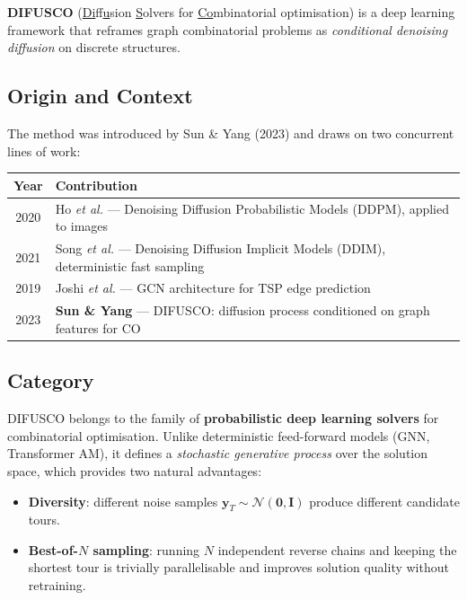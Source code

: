 \documentclass[12pt,a4paper]{article}
\begin{document}
\textbf{DIFUSCO} (\underline{Di}f\underline{fu}sion \underline{S}olvers for
\underline{Co}mbinatorial optimisation) is a deep learning framework that
reframes graph combinatorial problems as \emph{conditional denoising diffusion}
on discrete structures.

\subsection*{Origin and Context}

The method was introduced by Sun \& Yang (2023) and draws on two concurrent
lines of work:

\begin{center}
\begin{tabularx}{\linewidth}{c>{\raggedright\arraybackslash}X}
\toprule
\textbf{Year} & \textbf{Contribution} \\
\midrule
2020 & Ho \textit{et al.} --- Denoising Diffusion Probabilistic Models (DDPM),
       applied to images \\
2021 & Song \textit{et al.} --- Denoising Diffusion Implicit Models (DDIM),
       deterministic fast sampling \\
2019 & Joshi \textit{et al.} --- GCN architecture for TSP edge prediction \\
2023 & \textbf{Sun \& Yang} --- DIFUSCO: diffusion process conditioned on graph
       features for CO \\
\bottomrule
\end{tabularx}
\end{center}

\subsection*{Category}

DIFUSCO belongs to the family of \textbf{probabilistic deep learning solvers}
for combinatorial optimisation.
Unlike deterministic feed-forward models (GNN, Transformer AM), it defines a
\emph{stochastic generative process} over the solution space, which provides
two natural advantages:
\begin{itemize}[leftmargin=1.5em]
  \item \textbf{Diversity}: different noise samples $\mathbf{y}_T \sim
    \mathcal{N}(\mathbf{0},\mathbf{I})$ produce different candidate tours.
  \item \textbf{Best-of-$N$ sampling}: running $N$ independent reverse chains
    and keeping the shortest tour is trivially parallelisable and improves
    solution quality without retraining.
\end{itemize}
\end{document}
